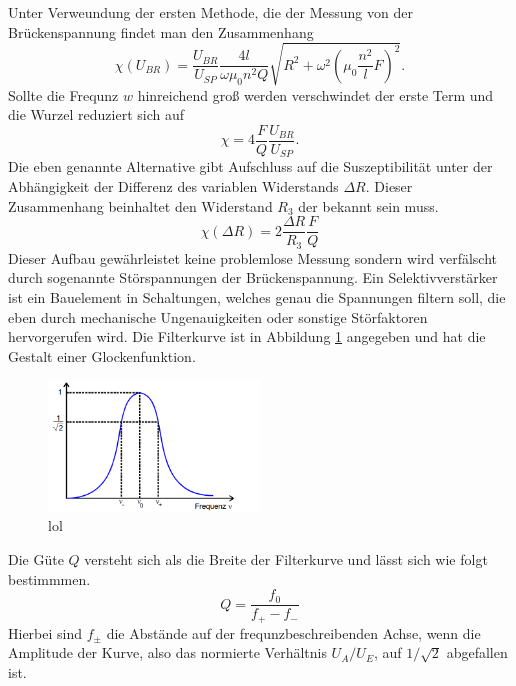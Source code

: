 Unter Verweundung der ersten Methode, die der Messung von der Brückenspannung findet man den Zusammenhang
\begin{equation*}
    \label{eqn:werdasliestistOMEGAdummXD}
    \chi(U_{BR})= \frac{U_{BR}}{U_{SP}} \frac{4l}{\omega \mu_0 n^2 Q} \sqrt{R^2+\omega^2 \left( \mu_0 \frac{n^2}{l}F \right)^2}.
\end{equation*}
Sollte die Frequnz $w$ hinreichend groß werden verschwindet der erste Term und die Wurzel reduziert sich auf 
\begin{equation}
    \label{eq:XD}
     \chi = 4 \frac{F}{Q}\frac{U_{BR}}{U_{SP}}.
\end{equation}
Die eben genannte Alternative gibt Aufschluss auf die Suszeptibilität unter der Abhängigkeit der Differenz des variablen Widerstands %
$\Delta R$. Dieser Zusammenhang beinhaltet den Widerstand $R_3$ der bekannt sein muss.
\begin{equation}
    \label{eqn:werdasliestistOMEGAundGIGAdummXD}
    \chi(\Delta R) = 2 \frac{\Delta R}{R_3}\frac{F}{Q}
\end{equation}
Dieser Aufbau gewährleistet keine problemlose Messung sondern wird verfälscht durch sogenannte Störspannungen der Brückenspannung.
Ein Selektivverstärker ist ein Bauelement in Schaltungen, welches genau die Spannungen filtern soll, die eben durch mechanische Ungenauigkeiten 
oder sonstige Störfaktoren hervorgerufen wird. Die Filterkurve ist in Abbildung \ref{fig:glocke} angegeben und hat die Gestalt einer Glockenfunktion.
\begin{figure}
    \centering
    \includegraphics[width=0.5\textwidth]{bilder/glocke.png}
    \caption{lol}
    \label{fig:glocke}
\end{figure}
Die Güte $Q$ versteht sich als die Breite der Filterkurve und lässt sich wie folgt bestimmmen.
\begin{equation}
    \label{eq:achduliebeGüte}    
    Q= \frac{f_0}{f_+ - f_-}
\end{equation}
Hierbei sind $f_{\pm}$ die Abstände auf der frequnzbeschreibenden Achse, wenn die Amplitude der Kurve, also das normierte Verhältnis $U_A/U_E$,
auf $1/\sqrt{2}$ abgefallen ist.